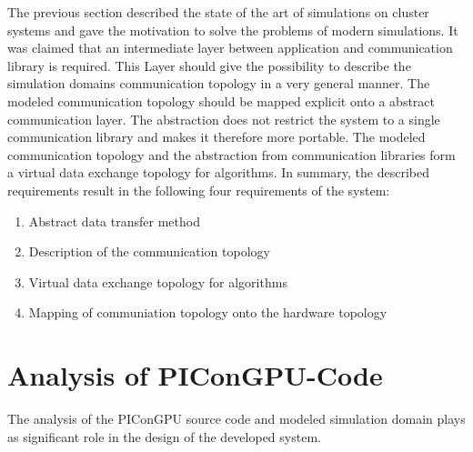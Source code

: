 

The previous section described the state of the art of simulations on
cluster systems and gave the motivation to solve the problems of
modern simulations. It was claimed that an intermediate layer between
application and communication library is required.  This Layer should
give the possibility to describe the simulation domains communication
topology in a very general manner. The modeled communication topology
should be mapped explicit onto a abstract communication layer.  The
abstraction does not restrict the system to a single communication
library and makes it therefore more portable.  The modeled
communication topology and the abstraction from communication
libraries form a virtual data exchange topology for algorithms. In
summary, the described requirements result in the following four
requirements of the system:

\begin{enumerate}
\item Abstract data transfer method
\item Description of the communication topology
\item Virtual data exchange topology for algorithms
\item Mapping of communiation topology onto the hardware topology
\end{enumerate}

\section{Analysis of PIConGPU-Code}
\label{sec:picongpu_analysis}

The analysis of the PIConGPU source code and modeled simulation domain
plays as significant role in the design of the developed system.


